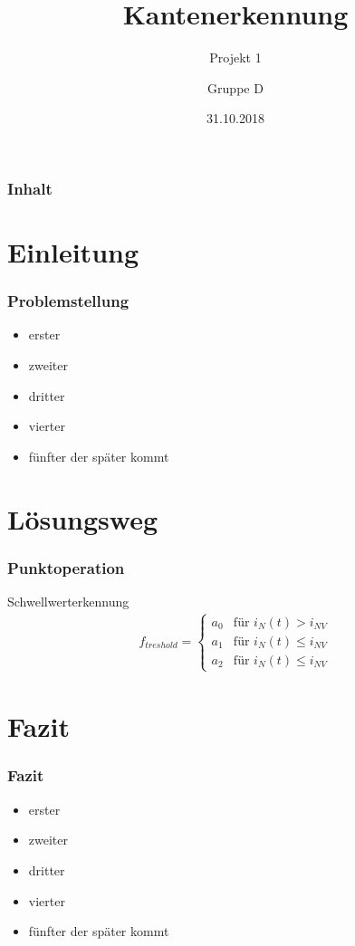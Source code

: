 \documentclass[12pt]{beamer}
\begin{document}
	\author{Gruppe D}
	\title{Kantenerkennung}
	\subtitle{Projekt 1}
	\date{31.10.2018}
	\subject{was das}
	
	
\begin{frame}
	\titlepage
\end{frame}

\begin{frame}
	\frametitle{Inhalt}
	\tableofcontents	
\end{frame}

\section{Einleitung}
	\begin{frame}
		\frametitle{Problemstellung}
		\begin{itemize}
			\item erster
			\item zweiter
			\item dritter
			\item vierter
			\item fünfter der später kommt		
		\end{itemize}
		
	\end{frame}

\section{Lösungsweg}
\begin{frame}
	\frametitle{Punktoperation}
	\begin{block}{Schwellwerterkennung}	
		\begin{eqnarray*}
			f_{treshold}=
			\begin{cases}
			a_0   			& \text{für }i_N(t) > i_{NV}\\
			a_1        		& \text{für }i_N(t) \leq i_{NV} \\
			a_2        		& \text{für }i_N(t) \leq i_{NV}
			\end{cases}
		\end{eqnarray*}
	\end{block}
\end{frame}

 \section{Fazit}
	\begin{frame}
		\frametitle{Fazit}
		\begin{itemize}
			\item erster
			\item zweiter
			\item dritter
			\item vierter
			\item fünfter der später kommt		
		\end{itemize}
	\end{frame}

\section*{}

\end{document}
